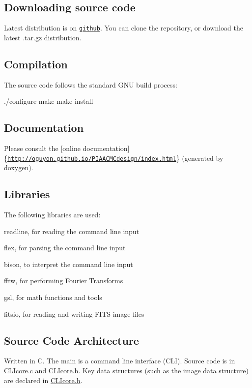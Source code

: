 \subsection*{Downloading source code}

Latest distribution is on \href{https://github.com/oguyon/PIAACMCdesign}{\tt github}. You can clone the repository, or download the latest .tar.\+gz distribution.

\subsection*{Compilation}

The source code follows the standard G\+N\+U build process\+: \begin{DoxyVerb}./configure
make
make install
\end{DoxyVerb}


\subsection*{Documentation}

Please consult the \mbox{[}online documentation\mbox{]}\{\href{http://oguyon.github.io/PIAACMCdesign/index.html}{\tt http\+://oguyon.\+github.\+io/\+P\+I\+A\+A\+C\+M\+Cdesign/index.\+html}\} (generated by doxygen).

\subsection*{Libraries}

The following libraries are used\+:
\begin{DoxyItemize}
\item readline, for reading the command line input
\item flex, for parsing the command line input
\item bison, to interpret the command line input
\item fftw, for performing Fourier Transforms
\item gsl, for math functions and tools
\item fitsio, for reading and writing F\+I\+T\+S image files
\end{DoxyItemize}

\subsection*{Source Code Architecture}

Written in C. The main is a command line interface (C\+L\+I). Source code is in \hyperlink{CLIcore_8c}{C\+L\+Icore.\+c} and \hyperlink{CLIcore_8h}{C\+L\+Icore.\+h}. Key data structures (such as the image data structure) are declared in \hyperlink{CLIcore_8h}{C\+L\+Icore.\+h}.

